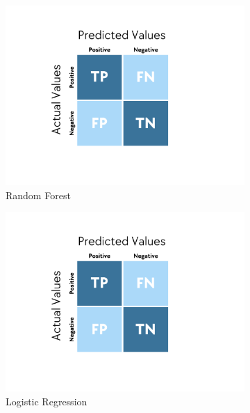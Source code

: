 \begin{figure}[h!]
\centering
\begin{subfigure}{0.32\textwidth}
\centering
\includegraphics[width=\textwidth]{images/cm_rf.png}
\caption{Random Forest}
\end{subfigure}
\begin{subfigure}{0.32\textwidth}
\centering
\includegraphics[width=\textwidth]{images/cm_rf.png}
\caption{Logistic Regression}
\end{subfigure}
\begin{subfigure}{0.32\textwidth}
\centering

\end{subfigure}
\end{figure}
